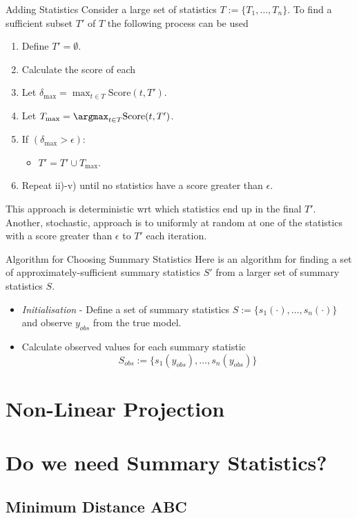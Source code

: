 \documentclass[11pt,a4paper]{article}
\begin{document}
  \begin{remark}{Adding Statistics}
    Consider a large set of statistics $T:=\{T_1,\dots,T_n\}$. To find a sufficient subset $T'$ of $T$ the following process can be used
    \begin{enumerate}
      \item Define $T'=\emptyset$.
      \item Calculate the score of each
      \item Let $\delta_\text{max}=\max_{t\in T}\text{Score}(t,T')$.
      \item Let $T_\text{max}=\argmax_{t\in T}\text{Score}(t,T')$.
      \item If $(\delta_\text{max}>\epsilon)$:
      \begin{itemize}
        \item $T'=T'\cup T_\text{max}$.
      \end{itemize}
      \item Repeat ii)-v) until no statistics have a score greater than $\epsilon$.
    \end{enumerate}
    This approach is deterministic wrt which statistics end up in the final $T'$. Another, stochastic, approach is to uniformly at random at one of the statistics with a score greater than $\epsilon$ to $T'$ each iteration.
  \end{remark}

  \begin{proposition}{Algorithm for Choosing Summary Statistics}
    Here is an algorithm for finding a set of approximately-sufficient summary statistics $S'$ from a larger set of summary statistics $S$.
    \begin{itemize}
      \item \textit{Initialisation} - Define a set of summary statistics $S:=\{s_1(\cdot),\dots,s_n(\cdot)\}$ and observe $y_{obs}$ from the true model.
      \item Calculate observed values for each summary statistic
      \[ S_{obs}:=\{s_1(y_{obs}),\dots,s_n(y_{obs})\} \]
    \end{itemize}
  \end{proposition}

\section{Non-Linear Projection}

\section{Do we need Summary Statistics?}

\subsection{Minimum Distance ABC}

\newpage


\end{document}
